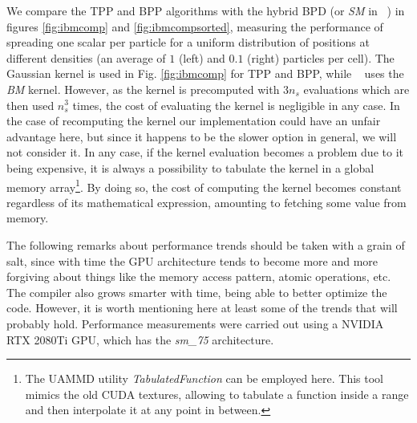 \documentclass[twoside,openright,titlepage,numbers=noenddot,%
headinclude,footinclude,cleardoublepage=empty,abstract=on,
BCOR=5mm,fontsize=11pt, dvipsnames, paper=b5
]{scrreprt}
\newcommand{\uammd}{\gls{UAMMD}\xspace}
\newcommand{\gpu}{\gls{GPU}\xspace}
\begin{document}
We compare the TPP and BPP algorithms with the hybrid BPD (or \emph{SM} in ~\cite{Shih2021}) in figures \ref{fig:ibmcomp} and \ref{fig:ibmcompsorted}, measuring the performance of spreading one scalar per particle for a uniform distribution of positions at different densities (an average of $1$ (left) and $0.1$ (right) particles per cell). The Gaussian kernel is used in Fig. \ref{fig:ibmcomp} for TPP and BPP, while ~\cite{Shih2021} uses the \emph{BM} kernel. However, as the kernel is precomputed with $3n_s$ evaluations which are then used $n_s^3$ times, the cost of evaluating the kernel is negligible in any case. In the case of recomputing the kernel our implementation could have an unfair advantage here, but since it happens to be the slower option in general, we will not consider it.
In any case, if the kernel evaluation becomes a problem due to it being expensive, it is always a possibility to tabulate the kernel in a global memory array\footnote{The \uammd utility \emph{TabulatedFunction} can be employed here. This tool mimics the old CUDA textures, allowing to tabulate a function inside a range and then interpolate it at any point in between.}. By doing so, the cost of computing the kernel becomes constant regardless of its mathematical expression, amounting to fetching some value from memory.

The following remarks about performance trends should be taken with a grain of salt, since with time the \gpu architecture tends to become more and more forgiving about things like the memory access pattern, atomic operations, etc. The compiler also grows smarter with time, being able to better optimize the code. However, it is worth mentioning here at least some of the trends that will probably hold. Performance measurements were carried out using a NVIDIA RTX 2080Ti \gpu, which has the \emph{sm\_75} architecture.
\end{document}
